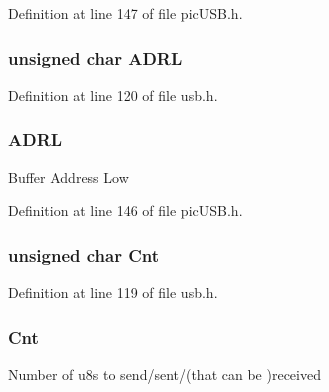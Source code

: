 Definition at line 147 of file pic\-U\-S\-B.\-h.

\hypertarget{union_buffer_descriptor_table_ac844d9c6a5693226cd0a118457f1136b}{
\subsubsection[{A\-D\-R\-L}]{\setlength{\rightskip}{0pt plus 5cm}unsigned char A\-D\-R\-L}}\label{union_buffer_descriptor_table_ac844d9c6a5693226cd0a118457f1136b}


Definition at line 120 of file usb.\-h.

\hypertarget{union_buffer_descriptor_table_a77e1802393acbdeaa4cb4b03cd835812}{
\subsubsection[{A\-D\-R\-L}]{ A\-D\-R\-L}}\label{union_buffer_descriptor_table_a77e1802393acbdeaa4cb4b03cd835812}
Buffer Address Low 

Definition at line 146 of file pic\-U\-S\-B.\-h.

\hypertarget{union_buffer_descriptor_table_a993db247f4d91af55d6e7d23e79af388}{
\subsubsection[{Cnt}]{\setlength{\rightskip}{0pt plus 5cm}unsigned char Cnt}}\label{union_buffer_descriptor_table_a993db247f4d91af55d6e7d23e79af388}


Definition at line 119 of file usb.\-h.

\hypertarget{union_buffer_descriptor_table_a9cb3e00771d7b26cb7d86fc95aa48492}{
\subsubsection[{Cnt}]{ Cnt}}\label{union_buffer_descriptor_table_a9cb3e00771d7b26cb7d86fc95aa48492}
Number of u8s to send/sent/(that can be )received 

